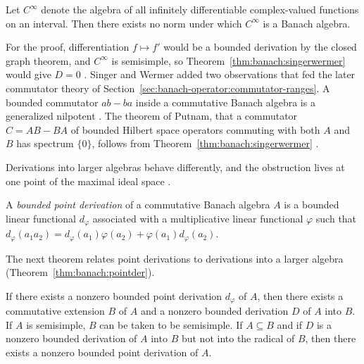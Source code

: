 \begin{corollary}\label{cor:banach:cinfty}
Let $C^\infty$ denote the algebra of all infinitely differentiable
complex-valued functions on an interval. Then there exists no norm under
which $C^\infty$ is a Banach algebra.
\end{corollary}

For the proof, differentiation $f\mapsto f'$ would be a bounded derivation
by the closed graph theorem, and $C^\infty$ is semisimple, so
Theorem~\ref{thm:banach:singerwermer} would give $D=0$
\cite[p.~262]{SingerWermer1955}. Singer and Wermer added two observations
that fed the later commutator theory of
Section~\ref{sec:banach-operator:commutator-ranges}. A bounded commutator
$ab-ba$ inside a commutative Banach algebra is a generalized nilpotent
\cite[p.~261]{SingerWermer1955}. The theorem of Putnam, that a commutator
$C=AB-BA$ of bounded Hilbert space operators commuting with both $A$ and
$B$ has spectrum $\{0\}$, follows from Theorem~\ref{thm:banach:singerwermer}
\cite[p.~264]{SingerWermer1955}.

Derivations into larger algebras behave differently, and the obstruction
lives at one point of the maximal ideal space
\cite[p.~262]{SingerWermer1955}.

\begin{definition}\label{def:banach:pointderivation}
A \emph{bounded point derivation} of a commutative Banach algebra $A$ is a
bounded linear functional $d_\varphi$ associated with a multiplicative
linear functional $\varphi$ such that
$d_\varphi(a_1a_2)=d_\varphi(a_1)\varphi(a_2)+\varphi(a_1)d_\varphi(a_2)$.
\end{definition}

The next theorem relates point derivations to derivations into a larger
algebra (Theorem~\ref{thm:banach:pointder}).

\begin{theorem}\label{thm:banach:pointder}
If there exists a nonzero bounded point derivation $d_\varphi$ of $A$, then
there exists a commutative extension $B$ of $A$ and a nonzero bounded
derivation $D$ of $A$ into $B$. If $A$ is semisimple, $B$ can be taken to
be semisimple. If $A\subseteq B$ and if $D$ is a nonzero bounded derivation
of $A$ into $B$ but not into the radical of $B$, then there exists a
nonzero bounded point derivation of $A$.
\end{theorem}

